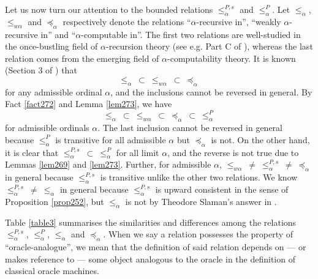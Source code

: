 \documentclass[12pt, twoside]{memoir}
\numberwithin{equation}{section}
\theoremstyle{definition}
\theoremstyle{remark}
\theoremstyle{definition}
\theoremstyle{definition}
\theoremstyle{definition}
\theoremstyle{remark}
\begin{document}
Let us now turn our attention to the bounded relations $\leq^{P, s}_{\alpha}$ and $\leq^P_{\alpha}$. Let $\leq_{\alpha}$, $\leq_{w \alpha}$ and $\preceq_{\alpha}$ respectively denote the relations ``$\alpha$-recursive in'', ``weakly $\alpha$-recursive in'' and ``$\alpha$-computable in''. The first two relations are well-studied in the once-bustling field of $\alpha$-recursion theory (see e.g. Part C of \cite{sacks}), whereas the last relation comes from the emerging field of $\alpha$-computability theory. It is known (Section 3 of \cite{koepke2}) that 
\begin{equation*}
    \leq_{\alpha} \ \subset \ \leq_{w \alpha} \ \subset \ \preceq_{\alpha}
\end{equation*}
for any admissible ordinal $\alpha$, and the inclusions cannot be reversed in general. By Fact \ref{fact272} and Lemma \ref{lem273}, we have
\begin{equation}\label{eq2}
    \leq_{\alpha} \ \subset \ \leq_{w \alpha} \ \subset \ \preceq_{\alpha} \ \subset \ \leq^P_{\alpha}
\end{equation}
for admissible ordinals $\alpha$. The last inclusion cannot be reversed in general because $\leq^P_{\alpha}$ is transitive for all admissible $\alpha$ but $\preceq_{\alpha}$ is not. On the other hand, it is clear that $\leq^{P, s}_{\alpha} \ \subset \ \leq^P_{\alpha}$ for all limit $\alpha$, and the reverse is not true due to Lemmas \ref{lem269} and \ref{lem273}. Further, for admissible $\alpha$, $\leq_{w \alpha} \ \neq \ \leq^{P, s}_{\alpha} \ \neq \ \preceq_{\alpha}$ in general because $\leq^{P, s}_{\alpha}$ is transitive unlike the other two relations. We know $\leq^{P, s}_{\alpha} \ \neq \ \leq_{\alpha}$ in general because $\leq^{P, s}_{\alpha}$ is upward consistent in the sense of Proposition \ref{prop252}, but $\leq_{\alpha}$ is not by Theodore Slaman's answer in \cite{slaman}. 

Table \ref{table3} summarises the similarities and differences among the relations $\leq^{P, s}_{\alpha}$, $\leq^P_{\alpha}$, $\leq_{\alpha}$ and $\preceq_{\alpha}$. When we say a relation possesses the property of ``oracle-analogue'', we mean that the definition of said relation depends on --- or makes reference to --- some object analogous to the oracle in the definition of classical oracle machines.
\end{document}
